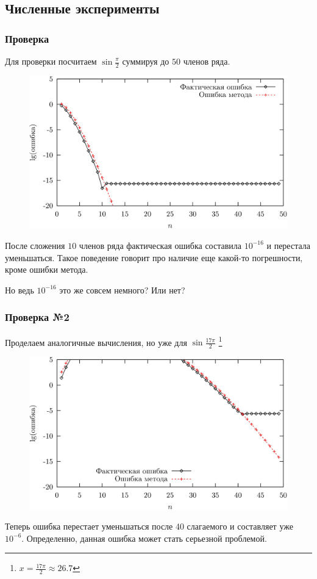 \documentclass[aspectratio=43,unicode]{beamer}
\begin{document}
\subsection{Численные эксперименты}
\begin{frame}
\frametitle{Проверка}
	Для проверки посчитаем $\sin \frac{\pi}{2}$ суммируя до $50$ членов ряда.

	\begin{figure}%
	\centering
	\includegraphics[height=0.4\textheight]{sine_pi_2.png}
	\end{figure}

	После сложения $10$ членов ряда фактическая ошибка составила $10^{-16}$ и перестала уменьшаться.
	Такое поведение говорит про наличие еще какой-то погрешности, кроме ошибки метода.
	\begin{block}{}
	Но ведь $10^{-16}$ это же совсем немного? Или нет?
	\end{block}
\end{frame}

\begin{frame}
\frametitle{Проверка №2}
	Проделаем аналогичные вычисления, но уже для $\sin \frac{17\pi}{2}$
	\footnote{$x = \frac{17\pi}{2} \approx 26.7$}

	\begin{figure}%
	\centering
	\includegraphics[height=0.4\textheight]{sine_17pi_2.png}
	\end{figure}

	Теперь ошибка перестает уменьшаться после 40 слагаемого и составляет уже $10^{-6}$.
	Определенно, данная ошибка может стать серьезной проблемой.
\end{frame}
\end{document}

